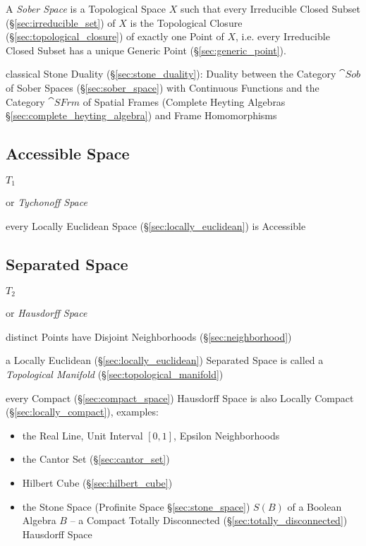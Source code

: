 A \emph{Sober Space} is a Topological Space $X$ such that every Irreducible
Closed Subset (\S\ref{sec:irreducible_set}) of $X$ is the Topological Closure
(\S\ref{sec:topological_closure}) of exactly one Point of $X$, i.e. every
Irreducible Closed Subset has a unique Generic Point
(\S\ref{sec:generic_point}).

classical Stone Duality (\S\ref{sec:stone_duality}): Duality between the
Category $\cat{Sob}$ of Sober Spaces (\S\ref{sec:sober_space}) with Continuous
Functions and the Category $\cat{SFrm}$ of Spatial Frames (Complete Heyting
Algebras \S\ref{sec:complete_heyting_algebra}) and Frame Homomorphisms



\subsection{Accessible Space}\label{sec:accessible_space}

$\xspace{T}_1$

or \emph{Tychonoff Space}

every Locally Euclidean Space (\S\ref{sec:locally_euclidean}) is Accessible



\subsection{Separated Space}\label{sec:separated_space}

$\xspace{T}_2$

or \emph{Hausdorff Space}

distinct Points have Disjoint Neighborhoods (\S\ref{sec:neighborhood})

a Locally Euclidean (\S\ref{sec:locally_euclidean}) Separated Space is called a
\emph{Topological Manifold} (\S\ref{sec:topological_manifold})

every Compact (\S\ref{sec:compact_space}) Hausdorff Space is also Locally
Compact (\S\ref{sec:locally_compact}), examples:
\begin{itemize}
  \item the Real Line, Unit Interval $[0,1]$, Epsilon Neighborhoods
  \item the Cantor Set (\S\ref{sec:cantor_set})
  \item Hilbert Cube (\S\ref{sec:hilbert_cube})
  \item the Stone Space (Profinite Space \S\ref{sec:stone_space})
    $\xspace{S}(B)$ of a Boolean Algebra $B$ -- a Compact Totally Disconnected
    (\S\ref{sec:totally_disconnected}) Hausdorff Space
\end{itemize}

